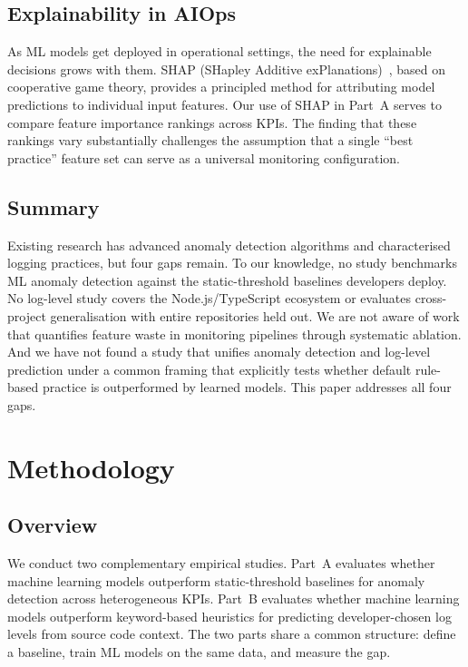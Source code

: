 \documentclass[10pt,twocolumn]{article}
\begin{document}
\subsection{Explainability in AIOps}

As ML models get deployed in operational settings, the need for explainable decisions grows with them. SHAP (SHapley Additive exPlanations)~\cite{lundberg2017}, based on cooperative game theory, provides a principled method for attributing model predictions to individual input features. Our use of SHAP in Part~A serves to compare feature importance rankings across KPIs. The finding that these rankings vary substantially challenges the assumption that a single ``best practice'' feature set can serve as a universal monitoring configuration.

\subsection{Summary}

Existing research has advanced anomaly detection algorithms and characterised logging practices, but four gaps remain. To our knowledge, no study benchmarks ML anomaly detection against the static-threshold baselines developers deploy. No log-level study covers the Node.js/TypeScript ecosystem or evaluates cross-project generalisation with entire repositories held out. We are not aware of work that quantifies feature waste in monitoring pipelines through systematic ablation. And we have not found a study that unifies anomaly detection and log-level prediction under a common framing that explicitly tests whether default rule-based practice is outperformed by learned models. This paper addresses all four gaps.

\section{Methodology}
\label{sec:method}

\subsection{Overview}

We conduct two complementary empirical studies. Part~A evaluates whether machine learning models outperform static-threshold baselines for anomaly detection across heterogeneous KPIs. Part~B evaluates whether machine learning models outperform keyword-based heuristics for predicting developer-chosen log levels from source code context. The two parts share a common structure: define a baseline, train ML models on the same data, and measure the gap.
\end{document}
